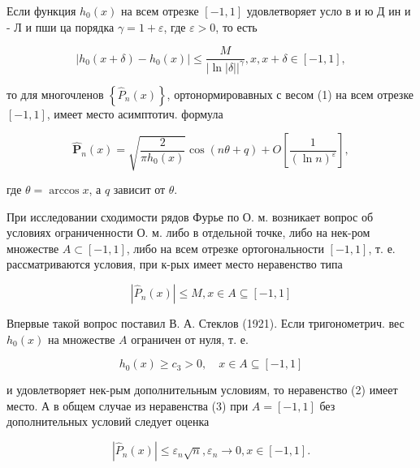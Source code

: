 \documentclass[10pt]{article}
\begin{document}
Если функция $h_{0}(x)$ на всем отрезке $[-1,1]$ удовлетворяет усло в и ю Д ин и - Л и пши ца порядка $\gamma=1+\varepsilon$, где $\varepsilon>0$, то есть



\[

\left|h_{0}(x+\delta)-h_{0}(x)\right| \leqslant \frac{M}{|\ln | \delta||^{\gamma}}, x, x+\delta \in[-1,1],

\]



то для многочленов $\left\{\hat{P}_{n}(x)\right\}$, ортонормировавных с весом (1) на всем отрезке $[-1,1]$, имеет место асимптотич. формула



\[

\hat{\boldsymbol{P}}_{n}(x)=\sqrt{\frac{2}{\pi h_{0}(x)}} \cos (n \theta+q)+O\left[\frac{1}{(\ln n)^{\varepsilon}}\right],

\]



где $\theta=\arccos x$, а $q$ зависит от $\theta$.



При исследовании сходимости рядов Фурье по О. м. возникает вопрос об условиях ограниченности О. м. либо в отдельной точке, либо на нек-ром множестве $A \subset[-1,1]$, либо на всем отрезке ортогональности $[-1,1]$, т. е. рассматриваются условия, при к-рых имеет место неравенство типа



\[

\left|\hat{P}_{n}(x)\right| \leqslant M, x \in A \subseteq[-1,1]

\]



Впервые такой вопрос поставил В. А. Стеклов (1921). Если тригонометрич. вес $h_{0}(x)$ на множестве $A$ ограничен от нуля, т. е.



\[

h_{0}(x) \geqslant c_{3}>0, \quad x \in A \subseteq[-1,1]

\]



и удовлетворяет нек-рым дополнительным условиям, то неравенство (2) имеет место. А в общем случае из неравенства (3) при $A=[-1,1]$ без дополнительных условий следует оценка



\[

\left|\hat{P}_{n}(x)\right| \leqslant \varepsilon_{n} \sqrt{n}, \varepsilon_{n} \longrightarrow 0, x \in[-1,1] .

\]
\end{document}

